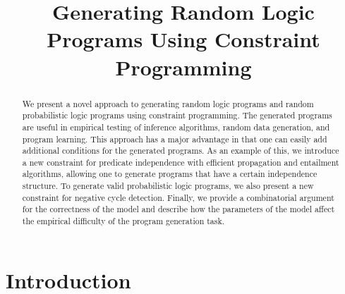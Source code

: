 \documentclass[runningheads]{llncs}
\begin{document}
\title{Generating Random Logic Programs Using Constraint Programming}

\maketitle



\begin{abstract}
  We present a novel approach to generating random logic programs and
  random probabilistic logic programs using constraint programming. The
  generated programs are useful in empirical testing of inference algorithms,
  random data generation, and program learning. This approach has a major
  advantage in that one can easily add additional conditions for the generated
  programs. As an example of this, we introduce a new constraint for predicate
  independence with efficient propagation and entailment algorithms, allowing
  one to generate programs that have a certain independence structure. To
  generate valid probabilistic logic programs, we also present a new constraint
  for negative cycle detection. Finally, we provide a combinatorial argument for
  the correctness of the model and describe how the parameters of the model
  affect the empirical difficulty of the program generation task.

\end{abstract}

\section{Introduction}
\end{document}
